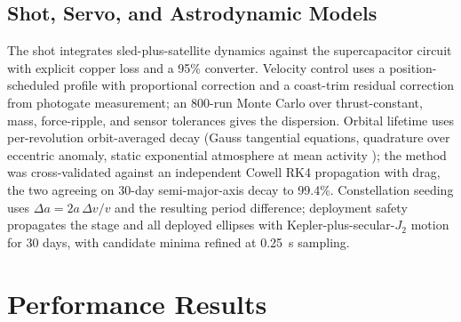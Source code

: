 \documentclass[conference]{IEEEtran}
\begin{document}
\subsection{Shot, Servo, and Astrodynamic Models}
The shot integrates sled-plus-satellite dynamics against the supercapacitor circuit with explicit copper loss and a 95\% converter. Velocity control uses a position-scheduled profile with proportional correction and a coast-trim residual correction from photogate measurement; an 800-run Monte Carlo over thrust-constant, mass, force-ripple, and sensor tolerances gives the dispersion. Orbital lifetime uses per-revolution orbit-averaged decay (Gauss tangential equations, quadrature over eccentric anomaly, static exponential atmosphere at mean activity \cite{vallado}); the method was cross-validated against an independent Cowell RK4 propagation with drag, the two agreeing on 30-day semi-major-axis decay to 99.4\%. Constellation seeding uses $\Delta a = 2a\,\Delta v/v$ and the resulting period difference; deployment safety propagates the stage and all deployed ellipses with Kepler-plus-secular-$J_2$ motion for 30 days, with candidate minima refined at 0.25~s sampling.

\section{Performance Results}
\end{document}

